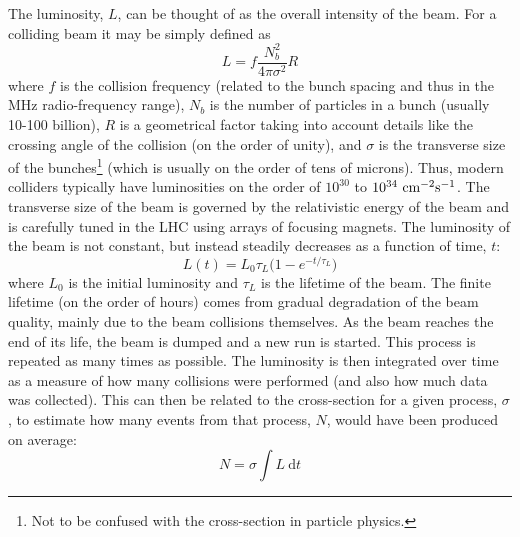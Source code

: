 The luminosity, $L$,  can be thought of as the overall intensity of the beam.
For a colliding beam it may be simply defined as
\begin{equation}
L=f \frac{N_b^2}{4\pi\sigma^2} R
\end{equation}
where $f$ is the collision frequency (related to the bunch spacing and thus
in the MHz radio-frequency range), 
$N_b$ is the number of particles in a bunch (usually 10-100 billion), 
$R$ is a  geometrical factor
taking into account details like the crossing angle of the collision (on the
order of unity),
and $\sigma$ is the transverse size of the bunches\footnote{Not to be confused
with the cross-section in particle physics.} (which 
is usually on the order of tens of microns).
Thus, modern colliders typically have luminosities on the order of 
$10^{30}$ to $10^{34}~\textrm{cm}^{-2}\textrm{s}^{-1}$.
The transverse size of the beam is governed by the relativistic 
energy of the beam and is carefully tuned in the LHC
using arrays of focusing magnets. 
The luminosity of the beam is not constant, but instead steadily decreases
as a function of time, $t$:
\begin{equation}
L(t) = L_0 \tau_L\Big( 1- e^{-t/\tau_L} \Big)
\end{equation}
where $L_0$ is the initial luminosity and $\tau_L$ is the lifetime of the 
beam. The finite lifetime (on the order of hours) comes from gradual 
degradation of the beam quality, mainly due to the beam collisions themselves.
As the beam reaches the end of its life, the beam is dumped and a new
run is started. This process is repeated as many times as possible. The 
luminosity is then integrated over time as a measure of how many collisions
were performed (and also how much data was collected).  This can
then be related to the cross-section for a given process, $\sigma$, to estimate
how many events from that process, $N$, would have been produced on average:
\begin{equation}
N=\sigma \int L~ \textrm{d}t
\end{equation}


